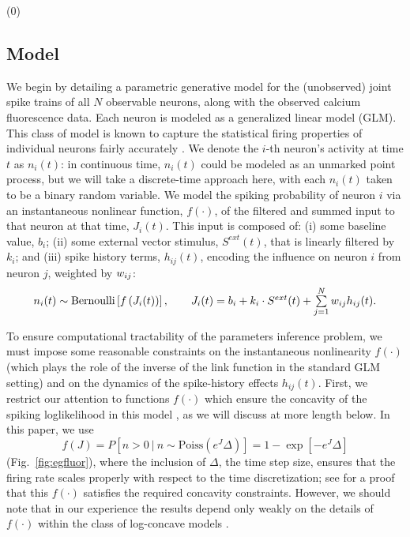 (0)\long\def\comment#1{}

\subsection{Model}
\label{sec:methods:markov-setup}

We begin by detailing a parametric generative model for the (unobserved) joint spike trains of all $N$ observable neurons, along with the observed calcium fluorescence data. Each neuron is modeled as a generalized linear model (GLM). This class of model is known to capture the statistical firing properties of individual neurons fairly accurately \cite{BRIL88,CSK88,BRIL92,PG00,PILL07,PAN03d,PAN04c,Rigat06,TRUC05,NYK06,KP06,Vidne08,Stevenson2009}. We denote the $i$-th neuron's activity at time $t$ as $n_i(t)$: in continuous time, $n_i(t)$ could be modeled as an unmarked point process, but we will take a discrete-time approach here, with each $n_i(t)$ taken to be a binary random variable. We model the spiking probability of neuron $i$ via an instantaneous nonlinear function, $f(\cdot)$, of the filtered and summed input to that neuron at that time, $J_i(t)$. This input is composed of: (i) some baseline value, $b_i$; (ii) some external vector stimulus, $S^{ext}(t)$, that is linearly filtered by $k_i$; and (iii) spike history terms, $h_{ij}(t)$, encoding the influence on neuron $i$ from neuron $j$, weighted by $w_{ij}$:
\begin{equation} \label{eqn:glm:definition}
\begin{array}{l}
n_i(t) \sim \text{Bernoulli}\left[f\left(J_i(t) \right) \right], \qquad
J_i(t)=b_i+k_i\cdot S^{ext}(t)+\sum \limits_{j=1}^{N} \w_{ij} h_{ij}(t).
\end{array}
\end{equation}

To ensure computational tractability of the parameters inference problem, we must impose some reasonable constraints on the instantaneous nonlinearity $f(\cdot)$ (which plays the role of the inverse of the link function in the standard GLM setting) and on the dynamics of the spike-history effects $h_{ij}(t)$. First, we restrict our attention to functions $f(\cdot)$ which ensure the concavity of the spiking loglikelihood in this model \cite{PAN04c,Escola07}, as we will discuss at more length below. In this paper, we use
\begin{equation}
f(J) = P\left[n>0 ~|~ n \sim \text{Poiss}\left(e^J\Delta\right)\right] = 1 - \exp[-e^J \Delta]
\end{equation}
(Fig.~\ref{fig:egfluor}), where the inclusion of $\Delta$, the time step size, ensures that the firing rate scales properly with respect to the time discretization; see \cite{Escola07} for a proof that this $f(\cdot)$ satisfies the required concavity constraints. However, we should note that in our experience the results depend only weakly on the details of $f(\cdot)$ within the class of log-concave models \cite{LD89,PAN04c}.


